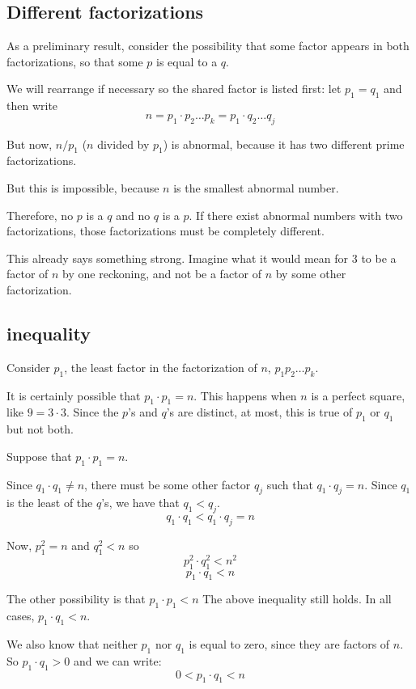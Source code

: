 \documentclass[11pt, oneside]{article}
\begin{document}
\subsection*{Different factorizations}

As a preliminary result, consider the possibility that some factor appears in both factorizations, so that some $p$ is equal to a $q$.

We will rearrange if necessary so the shared factor is listed first:  let $p_1 = q_1$ and then write
\[ n = p_1 \cdot p_2 \dots p_k = p_1 \cdot q_2 \dots q_j \]

But now, $n/p_1$ ($n$ divided by $p_1$) is abnormal, because it has two different prime factorizations.  

But this is impossible, because $n$ is the smallest abnormal number.

Therefore, no $p$ is a $q$ and no $q$ is a $p$.  If there exist abnormal numbers with two factorizations, those factorizations must be completely different.

This already says something strong.  Imagine what it would mean for $3$ to be a factor of $n$ by one reckoning, and not be a factor of $n$ by some other factorization.

\subsection*{inequality}

Consider $p_1$, the least factor in the factorization of $n$, $p_1 p_2 \dots p_k$.  

It is certainly possible that $p_1 \cdot p_1 = n$.  This happens when $n$ is a perfect square, like $9 = 3 \cdot 3$.  Since the $p$'s and $q$'s are distinct, at most, this is true of $p_1$ or $q_1$ but not both.  

Suppose that $p_1 \cdot p_1 = n$.

Since $q_1 \cdot q_1 \ne n$, there must be some other factor $q_j$ such that $q_1 \cdot q_j = n$.  Since $q_1$ is the least of the $q$'s, we have that $q_1 < q_j$.  
\[ q_1 \cdot q_1 < q_1 \cdot q_j = n \]

Now, $p_1^2 = n$ and $q_1^2 < n$ so
\[ p_1^2 \cdot q_1^2 < n^2 \]
\[ p_1 \cdot q_1 < n \]

The other possibility is that $p_1 \cdot p_1 < n$  The above inequality still holds.  In all cases, $p_1 \cdot q_1 < n$.

We also know that neither $p_1$ nor $q_1$ is equal to zero, since they are factors of $n$.  So $p_1 \cdot q_1 > 0$ and we can write:
\[ 0 < p_1 \cdot q_1 < n \]
\end{document}
